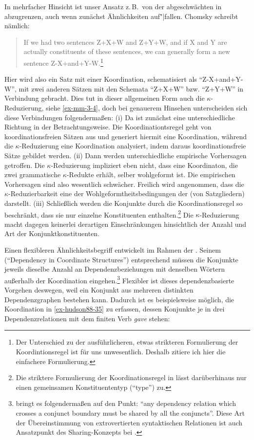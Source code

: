 In mehrfacher Hinsicht ist unser Ansatz z.\,B.\  von der abgeschwächten  in \citet[35]{Chomsky:57} abzugrenzen, auch wenn zunächst Ähnlichkeiten auf"|fallen. Chomsky schreibt nämlich:
\begin{quote}
If we had two sentences Z+X+W and Z+Y+W, and if X and Y are actually constituents of these sentences, we can generally form a new sentence Z-X+and+Y-W.\footnote{Der Unterschied zu der ausführlicheren, etwas strikteren Formulierung der Koordintionsregel \citep[(26)]{Chomsky:57} ist für uns unwesentlich. Deshalb zitiere ich hier die einfachere Formulierung.}
\end{quote}
Hier wird also ein Satz mit einer Koordination, schematisiert als "`Z-X+and+Y-W"', mit zwei anderen Sätzen mit den Schemata "`Z+X+W"' bzw. "`Z+Y+W"' in Verbindung gebracht. Dies tut in dieser allgemeinen Form auch die $\kappa$-Reduzierung, siehe \ref{ex-mm-3-4}, doch bei genauerem Hinsehen unterscheiden sich diese Verbindungen folgenderma\ss en:
(i) Da ist zunächst eine unterschiedliche Richtung in der Betrachtungsweise. Die Koordinationtsregel geht von koordinationsfreien Sätzen aus und generiert hiermit eine Koordination, während die $\kappa$-Reduzierung eine Koordination analysiert, indem daraus koordinationsfreie Sätze gebildet werden. (ii) Dann werden unterschiedliche empirische Vorhersagen getroffen. Die $\kappa$-Reduzierung impliziert eben nicht, dass eine Koordinaton, die zwei grammatische $\kappa$-Redukte erhält, selber wohlgeformt ist. Die empirischen Vorhersagen sind also wesentlich schwächer. Freilich wird angenommen, dass die $\kappa$-Reduzierbarkeit eine der Wohlgeformtheitsbedingungen der  (von Satzgliedern) darstellt. (iii) Schlie\ss lich werden die Konjunkte durch die Koordinationsregel so beschränkt, dass sie nur einzelne Konstituenten enthalten.\footnote{Die striktere Formulierung der Koordinationsregel in \citet[(26)]{Chomsky:57} lässt darüberhinaus nur einen gemeinsamen Konstituententyp ("`type"') zu.} Die $\kappa$-Reduzierung macht dagegen keinerlei derartigen Einschränkungen hinsichtlich der Anzahl und Art der Konjunktkonstituenten. 

Einen flexibleren Ähnlichkeitsbegriff entwickelt \cite{Hudson:88} im Rahmen der . Seinem  ("`Dependency in Coordinate Structures"') entsprechend müssen die Konjunkte jeweils dieselbe Anzahl an Dependenzbeziehungen mit denselben Wörtern au\ss erhalb der Koordination eingehen.\footnote{\citet[323]{Hudson:88} bringt es folgenderma\ss en auf den Punkt: "`any dependency relation which crosses a conjunct boundary must be shared by all the conjuncts"'. Diese Art der Übereinstimmung von extrovertierten syntaktischen Relationen ist auch Ansatzpunkt des Sharing-Konzepts bei \citet[35]{Johnson:04}. } Flexibler ist dieses dependenzbasierte Vorgehen deswegen, weil ein Konjunkt aus mehreren distinkten Dependenzgraphen bestehen kann. Dadurch ist es beispielsweise möglich, die Koordination in \ref{ex-hudson88-35} zu erfassen, dessen Konjunkte je in drei Dependenzrelationen mit dem finiten Verb {\it gave} stehen:   


